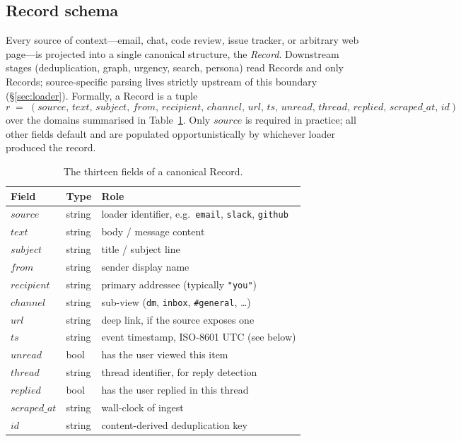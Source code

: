 \subsection{Record schema}
\label{sec:record}

Every source of context---email, chat, code review, issue tracker, or arbitrary
web page---is projected into a single canonical structure, the
\emph{Record}. Downstream stages (deduplication, graph, urgency, search,
persona) read Records and only Records; source-specific parsing lives strictly
upstream of this boundary (\S\ref{sec:loader}). Formally, a Record is a tuple
\[
r \;=\; (\mathit{source},\, \mathit{text},\, \mathit{subject},\, \mathit{from},\, \mathit{recipient},\, \mathit{channel},\, \mathit{url},\, \mathit{ts},\, \mathit{unread},\, \mathit{thread},\, \mathit{replied},\, \mathit{scraped\_at},\, \mathit{id})
\]
over the domains summarised in Table~\ref{tab:record}. Only $\mathit{source}$
is required in practice; all other fields default and are populated
opportunistically by whichever loader produced the record.

\begin{table}[h]
\centering
\small
\begin{tabular}{@{}lll@{}}
\toprule
Field & Type & Role \\
\midrule
$\mathit{source}$      & string  & loader identifier, e.g.\ \texttt{email}, \texttt{slack}, \texttt{github} \\
$\mathit{text}$        & string  & body / message content \\
$\mathit{subject}$     & string  & title / subject line \\
$\mathit{from}$        & string  & sender display name \\
$\mathit{recipient}$   & string  & primary addressee (typically \texttt{"you"}) \\
$\mathit{channel}$     & string  & sub-view (\texttt{dm}, \texttt{inbox}, \texttt{\#general}, \dots) \\
$\mathit{url}$         & string  & deep link, if the source exposes one \\
$\mathit{ts}$          & string  & event timestamp, ISO-8601 UTC (see below) \\
$\mathit{unread}$      & bool    & has the user viewed this item \\
$\mathit{thread}$      & string  & thread identifier, for reply detection \\
$\mathit{replied}$     & bool    & has the user replied in this thread \\
$\mathit{scraped\_at}$ & string  & wall-clock of ingest \\
$\mathit{id}$          & string  & content-derived deduplication key \\
\bottomrule
\end{tabular}
\caption{The thirteen fields of a canonical Record.}
\label{tab:record}
\end{table}


